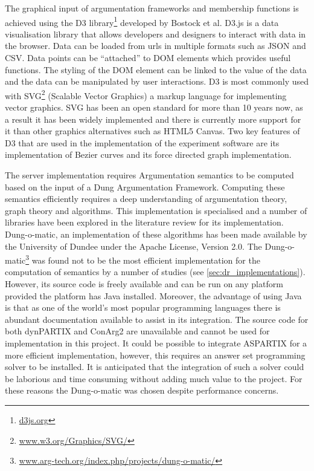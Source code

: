 The graphical input of argumentation frameworks and membership functions is achieved using the  D3 library\footnote{\url{d3js.org}} developed by Bostock et al.\cite{2011-d3} D3.js is a data visualisation library that allows developers and designers to interact with data in the browser. Data can be loaded from urls in multiple formats such as JSON and CSV. Data points can be ``attached'' to DOM elements which provides useful functions. The styling of the DOM element can be linked to the value of the data and the data can be manipulated by user interactions. D3 is most commonly used with SVG\footnote{\url{www.w3.org/Graphics/SVG/}} (Scalable Vector Graphics) a markup language for implementing vector graphics. SVG has been an open standard for more than 10 years now, as a result it has been widely implemented and there is currently more support for it than other graphics alternatives such as HTML5 Canvas. Two key features of D3 that are used in the implementation of the experiment software are its implementation of Bezier curves and its force directed graph implementation.

The server implementation requires Argumentation semantics to be computed based on the input of a Dung Argumentation Framework. Computing these semantics efficiently requires a deep understanding of argumentation theory, graph theory and algorithms. This implementation is specialised and a number of libraries have been explored in the literature review for its implementation. Dung-o-matic, an implementation of these algorithms has been made available by the University of Dundee under the Apache License, Version 2.0. The Dung-o-matic\footnote{\url{www.arg-tech.org/index.php/projects/dung-o-matic/}} was found not to be the most efficient implementation for the computation of semantics by a number of studies (see \ref{sec:dr_implementations}). However, its source code is freely available and can be run on any platform provided the platform has Java installed. Moreover, the advantage of using Java is that as one of the world's most popular programming languages there is abundant documentation available to assist in its integration. The source code for both dynPARTIX and ConArg2 are unavailable and cannot be used for implementation in this project. It could be possible to integrate ASPARTIX for a more efficient implementation, however, this requires an answer set programming solver to be installed. It is anticipated that the integration of such a solver could be laborious and time consuming without adding much value to the project. For these reasons the Dung-o-matic was chosen despite performance concerns.

